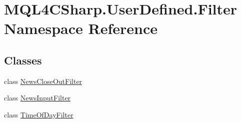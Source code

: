 \hypertarget{namespace_m_q_l4_c_sharp_1_1_user_defined_1_1_filter}{}\section{M\+Q\+L4\+C\+Sharp.\+User\+Defined.\+Filter Namespace Reference}
\label{namespace_m_q_l4_c_sharp_1_1_user_defined_1_1_filter}
\subsection*{Classes}
\begin{DoxyCompactItemize}
\item 
class \hyperlink{class_m_q_l4_c_sharp_1_1_user_defined_1_1_filter_1_1_news_close_out_filter}{News\+Close\+Out\+Filter}
\item 
class \hyperlink{class_m_q_l4_c_sharp_1_1_user_defined_1_1_filter_1_1_news_input_filter}{News\+Input\+Filter}
\item 
class \hyperlink{class_m_q_l4_c_sharp_1_1_user_defined_1_1_filter_1_1_time_of_day_filter}{Time\+Of\+Day\+Filter}
\end{DoxyCompactItemize}
